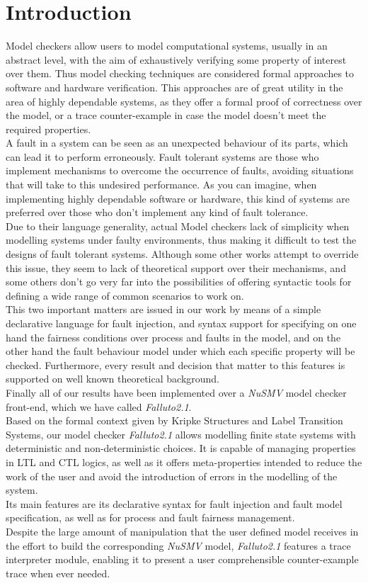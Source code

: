 \documentclass[12pt]{article}
\begin{document}
\section{Introduction}
Model checkers allow users to model computational systems, usually in an
abstract level, with the aim of exhaustively verifying some property of
interest over them. Thus model checking techniques are considered formal
approaches to software and hardware verification. This approaches are of great
utility in the area of highly dependable systems, as they offer a formal proof
of correctness over the model, or a trace counter-example in case the model
doesn't meet the required properties.\\
A fault in a system can be seen as an unexpected behaviour of its parts, which
can lead it to perform erroneously. Fault tolerant systems are those who
implement mechanisms to overcome the occurrence of faults, avoiding situations
that will take to this undesired performance. As you can imagine, when
implementing highly dependable software or hardware, this kind of systems are
preferred over those who don't implement any kind of fault tolerance.\\
Due to their language generality, actual Model checkers lack of simplicity when
modelling systems under faulty environments, thus making it difficult to test
the designs of fault tolerant systems. Although some other works attempt to
override this issue, they seem to lack of theoretical support over their
mechanisms, and some others don't go very far into the possibilities
of offering syntactic tools for defining a wide range of common scenarios to
work on.\\
This two important matters are issued in our work by means of a simple
declarative language for fault injection, and syntax support for specifying
on one hand the fairness conditions over process and faults in the model, and 
on the other hand the fault behaviour model under which each specific property
will be checked. Furthermore, every result and decision that matter to this
features is supported on well known theoretical background.\\
Finally all of our results have been implemented over a
\mbox{\textit{NuSMV}}\cite{cimatti} model checker front-end, which we have called
\mbox{\textit{Falluto2.1}}.\\
Based on the formal context given by Kripke Structures and Label Transition 
Systems, our model checker \mbox{\textit{Falluto2.1}} allows modelling finite
state systems with deterministic and non-deterministic choices. It is capable of managing
properties in LTL and CTL
logics, as well as it offers meta-properties intended to reduce the work of the
user and avoid the introduction of errors in the modelling of the system.\\
Its main features are its declarative syntax for fault injection and fault
model specification, as well as for process and fault fairness management.\\
Despite the large amount of manipulation that the user defined model receives
in the effort to build the corresponding \mbox{\textit{NuSMV}} model,
\mbox{\textit{Falluto2.1}} features a trace interpreter module, enabling it
to present a user comprehensible counter-example trace when ever needed.
\end{document}
